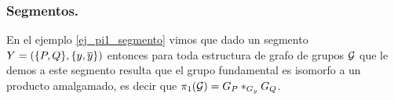 \documentclass[tesis.tex]{subfiles}
\begin{document}
%
%




\subsubsection{Segmentos.}\label{subsub_segmento}

En el ejemplo \ref{ej_pi1_segmento} vimos que dado un segmento $Y = (\{P,Q\}, \{y, \overline y\}  )$ entonces para toda estructura de grafo de grupos ${\cal G}$ que le demos a este segmento
resulta que el grupo fundamental es isomorfo a un producto amalgamado, es decir que $\pi_1({\cal G}) = G_P \ast_{G_y} G_Q$. 
\end{document}
